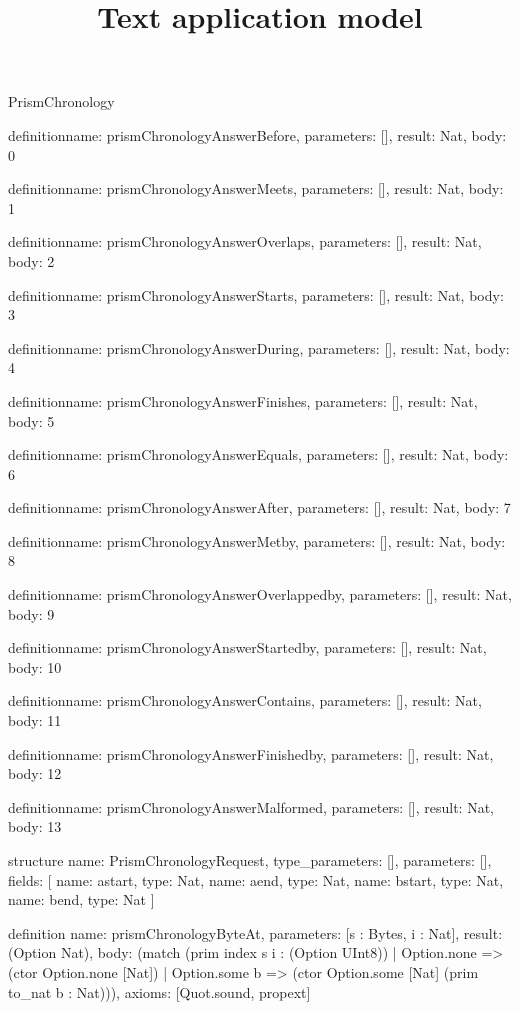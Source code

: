 \begin{lexlean}{PrismChronology}
\title{Text application model}
\begin{semanticmodule}
definition{name: prismChronologyAnswerBefore, parameters: [], result: Nat, body: 0}

definition{name: prismChronologyAnswerMeets, parameters: [], result: Nat, body: 1}

definition{name: prismChronologyAnswerOverlaps, parameters: [], result: Nat, body: 2}

definition{name: prismChronologyAnswerStarts, parameters: [], result: Nat, body: 3}

definition{name: prismChronologyAnswerDuring, parameters: [], result: Nat, body: 4}

definition{name: prismChronologyAnswerFinishes, parameters: [], result: Nat, body: 5}

definition{name: prismChronologyAnswerEquals, parameters: [], result: Nat, body: 6}

definition{name: prismChronologyAnswerAfter, parameters: [], result: Nat, body: 7}

definition{name: prismChronologyAnswerMetby, parameters: [], result: Nat, body: 8}

definition{name: prismChronologyAnswerOverlappedby, parameters: [], result: Nat, body: 9}

definition{name: prismChronologyAnswerStartedby, parameters: [], result: Nat, body: 10}

definition{name: prismChronologyAnswerContains, parameters: [], result: Nat, body: 11}

definition{name: prismChronologyAnswerFinishedby, parameters: [], result: Nat, body: 12}

definition{name: prismChronologyAnswerMalformed, parameters: [], result: Nat, body: 13}

structure{
  name: PrismChronologyRequest,
  type_parameters: [],
  parameters: [],
  fields: [
    {name: astart, type: Nat},
    {name: aend, type: Nat},
    {name: bstart, type: Nat},
    {name: bend, type: Nat}
  ]
}

definition{
  name: prismChronologyByteAt,
  parameters: [s : Bytes, i : Nat],
  result: (Option Nat),
  body: (match (prim index s i : (Option UInt8))
    | Option.none => (ctor Option.none [Nat])
    | Option.some b => (ctor Option.some [Nat] (prim to_nat b : Nat))),
  axioms: [Quot.sound, propext]
}


\end{semanticmodule}
\end{lexlean}
